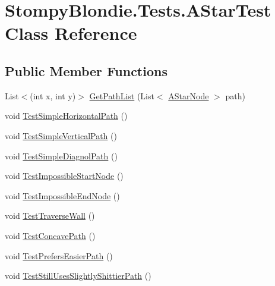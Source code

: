 \hypertarget{class_stompy_blondie_1_1_tests_1_1_a_star_test}{}\section{Stompy\+Blondie.\+Tests.\+A\+Star\+Test Class Reference}
\label{class_stompy_blondie_1_1_tests_1_1_a_star_test}
\subsection*{Public Member Functions}
\begin{DoxyCompactItemize}
\item 
List$<$(int x, int y)$>$ \mbox{\hyperlink{class_stompy_blondie_1_1_tests_1_1_a_star_test_af16e343de26cbff5d0bb64652453013a}{Get\+Path\+List}} (List$<$ \mbox{\hyperlink{class_stompy_blondie_1_1_math_1_1_a_star_node}{A\+Star\+Node}} $>$ path)
\item 
void \mbox{\hyperlink{class_stompy_blondie_1_1_tests_1_1_a_star_test_a6526af08de251c303a5c30d852dbd8c3}{Test\+Simple\+Horizontal\+Path}} ()
\item 
void \mbox{\hyperlink{class_stompy_blondie_1_1_tests_1_1_a_star_test_a8e5d78221da8a798dfd5819800236061}{Test\+Simple\+Vertical\+Path}} ()
\item 
void \mbox{\hyperlink{class_stompy_blondie_1_1_tests_1_1_a_star_test_aad68c04cdb056e578035c9dfa37fdab7}{Test\+Simple\+Diagnol\+Path}} ()
\item 
void \mbox{\hyperlink{class_stompy_blondie_1_1_tests_1_1_a_star_test_af506a164445d7e49964673ed3b5039de}{Test\+Impossible\+Start\+Node}} ()
\item 
void \mbox{\hyperlink{class_stompy_blondie_1_1_tests_1_1_a_star_test_ae054b5ca2f4e9434918ece6887abb1c4}{Test\+Impossible\+End\+Node}} ()
\item 
void \mbox{\hyperlink{class_stompy_blondie_1_1_tests_1_1_a_star_test_a7769798931b8c2da20793c9c65cf9f8a}{Test\+Traverse\+Wall}} ()
\item 
void \mbox{\hyperlink{class_stompy_blondie_1_1_tests_1_1_a_star_test_a0f205a6187501b6fa942d6360e19d291}{Test\+Concave\+Path}} ()
\item 
void \mbox{\hyperlink{class_stompy_blondie_1_1_tests_1_1_a_star_test_a6ff587eb89aaa2ea6115d334b8a12ad6}{Test\+Prefers\+Easier\+Path}} ()
\item 
void \mbox{\hyperlink{class_stompy_blondie_1_1_tests_1_1_a_star_test_afa53068f9da8d3664925753ed7cf3b4e}{Test\+Still\+Uses\+Slightly\+Shittier\+Path}} ()
\end{DoxyCompactItemize}


